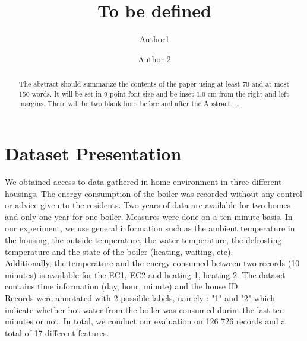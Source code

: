 \documentclass{llncs}
\begin{document}
\title{To be defined}
%
%
\author{Author1 \and Author 2}
%
%

%
\maketitle              %

\begin{abstract}
The abstract should summarize the contents of the paper
using at least 70 and at most 150 words. It will be set in 9-point
font size and be inset 1.0 cm from the right and left margins.
There will be two blank lines before and after the Abstract. \dots
{}
\end{abstract}
%
\section{Dataset Presentation}

We obtained access to data gathered in home environment in three different housings. The energy consumption of the boiler was recorded without any control or advice given to the residents.
Two years of data are available for two homes and only one year for one boiler.
Measures were done on a ten minute basis. In our experiment, we use general information such as the ambient temperature in the housing, the outside temperature, the water temperature, the defrosting temperature and the state of the boiler (heating, waiting, etc).
\\Additionally, the temperature and the energy consumed between two records (10 minutes) is available for the EC1, EC2 and heating 1, heating 2. The dataset contains time information (day, hour, minute) and the house ID. 
\\Records were annotated with 2 possible labels,  namely : "1" and "2" which indicate whether hot water from the boiler was consumed durint the last ten minutes or not.
In total, we conduct our evaluation on 126 726 records and a total of 17 different features.
\end{document}

